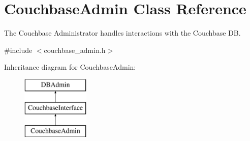 \hypertarget{classCouchbaseAdmin}{\section{Couchbase\-Admin Class Reference}
\label{classCouchbaseAdmin}
}


The Couchbase Administrator handles interactions with the Couchbase D\-B.  




{\ttfamily \#include $<$couchbase\-\_\-admin.\-h$>$}

Inheritance diagram for Couchbase\-Admin\-:\begin{figure}[H]
\begin{center}
\leavevmode
\includegraphics[height=3.000000cm]{classCouchbaseAdmin}
\end{center}
\end{figure}
